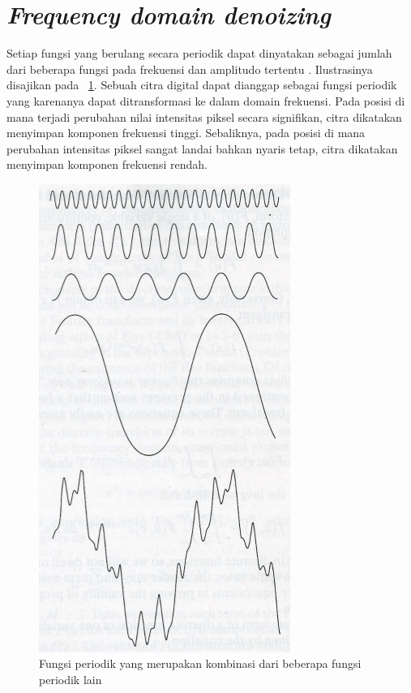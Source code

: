\section{\textit{Frequency domain denoizing}}
\label{sec:freqDenoizing}
Setiap fungsi yang berulang secara periodik dapat dinyatakan sebagai jumlah dari beberapa fungsi pada frekuensi dan amplitudo tertentu \cite{Gonzalez}. Ilustrasinya disajikan pada \figurename~\ref{fig:periodik}. Sebuah citra digital dapat dianggap sebagai fungsi periodik yang karenanya dapat ditransformasi ke dalam domain frekuensi. Pada posisi di mana terjadi perubahan nilai intensitas piksel secara signifikan, citra dikatakan menyimpan komponen frekuensi tinggi. Sebaliknya, pada posisi di mana perubahan intensitas piksel sangat landai bahkan nyaris tetap, citra dikatakan menyimpan komponen frekuensi rendah.

\begin{figure}
  \begin{center}
    \includegraphics[scale=.5]{pics/fourierBasic.png}
    \caption{Fungsi periodik yang merupakan kombinasi dari beberapa fungsi periodik lain}
    \label{fig:periodik}
  \end{center}
\end{figure}


